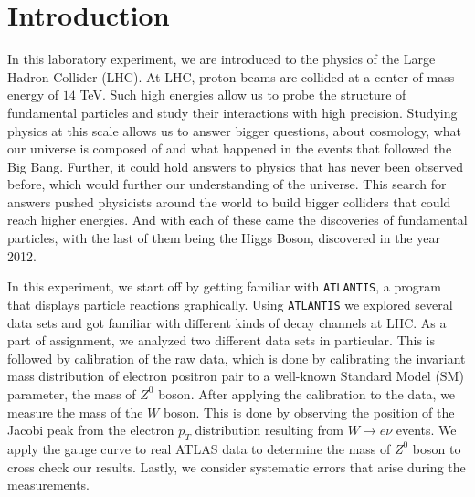 \documentclass[a4paper]{report}
\numberwithin{equation}{section}
\begin{document}
\tableofcontents

\chapter{Introduction} \label{chap:intro}

In this laboratory experiment, we are introduced to the physics of the Large Hadron Collider (LHC). At LHC, proton beams are collided at a center-of-mass energy of $14$ TeV. Such high energies allow us to probe the structure of fundamental particles and study their interactions with high precision. Studying physics at this scale allows us to answer bigger questions, about cosmology, what our universe is composed of and what happened in the events that followed the Big Bang. Further, it could hold answers to physics that has never been observed before, which would further our understanding of the universe. 
This search for answers pushed physicists around the world to build bigger colliders that could reach higher energies. And with each of these came the discoveries of fundamental particles, with the last of them being the Higgs Boson, discovered in the year 2012. 

In this experiment, we start off by getting familiar with \texttt{ATLANTIS}, a program that displays particle reactions graphically. Using \texttt{ATLANTIS} we explored several data sets and got familiar with different kinds of decay channels at LHC. As a part of assignment, we analyzed two different data sets in particular. This is followed by calibration of the raw data, which is done by calibrating the invariant mass distribution of electron positron pair to a well-known Standard Model (SM) parameter, the mass of $Z^0$ boson. After applying the calibration to the data, we measure the mass of the $W$ boson. This is done by observing the position of the Jacobi peak from the electron $p_T$ distribution resulting from $W \rightarrow e\nu$ 
events. We apply the gauge curve to real ATLAS data to determine the mass of $Z^0$ boson to cross check our results. Lastly, we consider systematic errors that arise during the measurements. 
\end{document}
